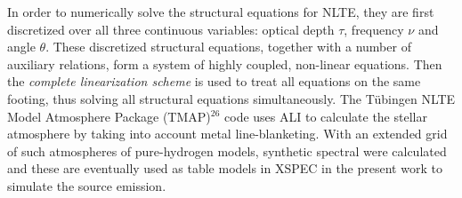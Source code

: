 		In order to numerically solve the structural equations for NLTE, they are first discretized over all three continuous variables: optical depth $\tau$, frequency $\nu$ and angle $\theta$. These discretized structural equations, together with a number of auxiliary relations, form a system of highly coupled, non-linear equations. Then the \textit{complete linearization scheme} \cite{auer1970non} is used to treat all equations on the same footing, thus solving all structural equations simultaneously. The T\"{u}bingen NLTE Model Atmosphere Package (TMAP)$^{26}$ code uses ALI to calculate the stellar atmosphere by taking into account metal line-blanketing. With an extended grid of such atmospheres of pure-hydrogen models, synthetic spectral were calculated and these are eventually used as table models in XSPEC in the present work to simulate the source emission.
